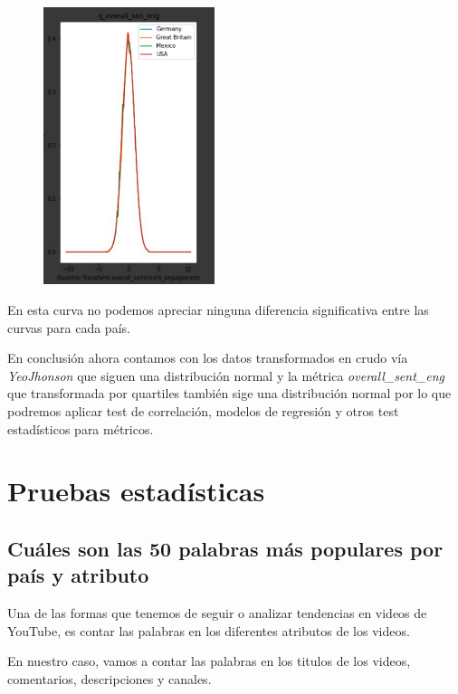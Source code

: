 \documentclass[a4paper,12pt]{article}
\begin{document}
\begin{figure}[h!]
\centering
\includegraphics[width=5cm]{grafica_transformada.JPG}
\end{figure}

En esta curva no podemos apreciar ninguna diferencia significativa entre las curvas para cada pa\'is.

En conclusi\'on ahora contamos con los datos transformados en crudo v\'ia {\itshape Yeo\-Jhonson} que siguen una distribuci\'on normal y la m\'etrica {\itshape overall\_sent\_eng} que transformada por quartiles tambi\'en sige una distribuci\'on normal por lo que podremos aplicar test de correlaci\'on, modelos de regresi\'on y otros test estad\'isticos para m\'etricos.

\section[item_pruebas]{Pruebas estad\'isticas}
\subsection{Cu\'ales son las 50 palabras m\'as populares por pa\'is y atributo}

Una de las formas que tenemos de seguir o analizar tendencias en videos de YouTube, es contar las palabras en los diferentes atributos de los videos.

En nuestro caso, vamos a contar las palabras en los titulos de los videos, comentarios, descripciones y canales.
\end{document}
